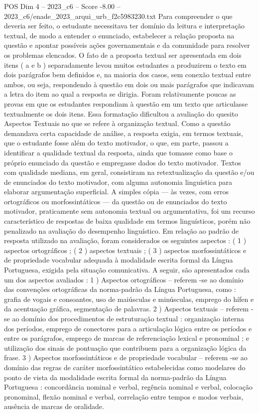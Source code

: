\begin{textsample}{POS Dim 4 – 2023\_c6 – Score -8.00 – 2023\_c6/enade\_2023\_arqui\_urb\_f2c5983230.txt}
Para compreender o que deveria ser feito, o estudante necessitava ter domínio da leitura e interpretação textual, de modo a entender o enunciado, estabelecer a relação proposta na questão e apontar possíveis ações governamentais e da comunidade para resolver os problemas elencados.
O fato de a proposta textual ser apresentada em dois itens ( a e b ) separadamente levou muitos estudantes a produzirem o texto em dois parágrafos bem definidos e, na maioria dos casos, sem conexão textual entre ambos, ou seja, respondendo à questão em dois ou mais parágrafos que indicavam a letra do item ao qual a resposta se dirigia.
Foram relativamente poucas as provas em que os estudantes respondiam à questão em um texto que articulasse textualmente os dois itens.
Essa formatação dificultou a avaliação do quesito Aspectos Textuais no que se refere à organização textual.
Como a questão demandava certa capacidade de análise, a resposta exigia, em termos textuais, que o estudante fosse além do texto motivador, o que, em parte, passou a identificar a qualidade textual da resposta, ainda que tomasse como base o próprio enunciado da questão e empregasse dados do texto motivador.
Textos com qualidade mediana, em geral, consistiram na retextualização da questão e/ou de enunciados do texto motivador, com alguma autonomia linguística para elaborar argumentação superficial.
A simples cópia — às vezes, com erros ortográficos ou morfossintáticos — da questão ou de enunciados do texto motivador, praticamente sem autonomia textual ou argumentativa, foi um recurso característico de respostas de baixa qualidade em termos linguísticos, porém não penalizado na avaliação do desempenho linguístico.
Em relação ao padrão de resposta utilizado na avaliação, foram considerados os seguintes aspectos : ( 1 ) aspectos ortográficos ; ( 2 ) aspectos textuais ; ( 3 ) aspectos morfossintáticos e de propriedade vocabular adequada à modalidade escrita formal da Língua Portuguesa, exigida pela situação comunicativa.
A seguir, são apresentados cada um dos aspectos avaliados : 1 ) Aspectos ortográficos – referem -se ao domínio das convenções ortográficas da norma-padrão da Língua Portuguesa, como : grafia de vogais e consoantes, uso de maiúsculas e minúsculas, emprego do hífen e da acentuação gráfica, segmentação de palavras. 2 ) Aspectos textuais – referem -se ao domínio dos procedimentos de estruturação textual : organização interna dos períodos, emprego de conectores para a articulação lógica entre os períodos e entre os parágrafos, emprego de marcas de referenciação lexical e pronominal ; e utilização dos sinais de pontuação que contribuem para a organização lógica da frase. 3 ) Aspectos morfossintáticos e de propriedade vocabular – referem -se ao domínio das regras de caráter morfossintático estabelecidas como modelares do ponto de vista da modalidade escrita formal da norma-padrão da Língua Portuguesa : concordância nominal e verbal, regência nominal e verbal, colocação pronominal, flexão nominal e verbal, correlação entre tempos e modos verbais, ausência de marcas de oralidade.

\end{textsample}
